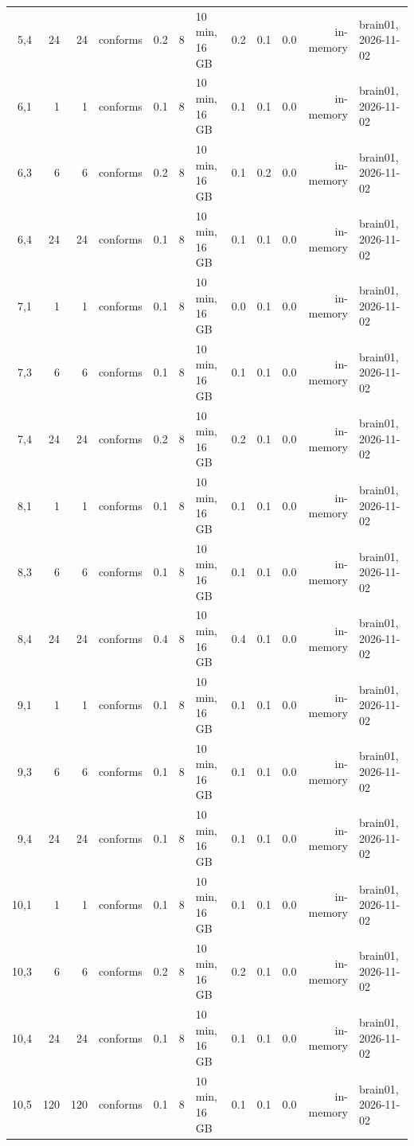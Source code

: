 \documentclass[10pt]{article}
\begin{document}
\begin{longtable}{@{}rrrlrrlrrrrl@{}}
\color{red} 5,4 & 24 & 24 & conforms & 0.2 & 8 & 10 min, 16 GB & 0.2 & 0.1 & 0.0 & in-memory & brain01, 2026-11-02 \\
\color{red} 6,1 & 1 & 1 & conforms & 0.1 & 8 & 10 min, 16 GB & 0.1 & 0.1 & 0.0 & in-memory & brain01, 2026-11-02 \\
\color{red} 6,3 & 6 & 6 & conforms & 0.2 & 8 & 10 min, 16 GB & 0.1 & 0.2 & 0.0 & in-memory & brain01, 2026-11-02 \\
\color{red} 6,4 & 24 & 24 & conforms & 0.1 & 8 & 10 min, 16 GB & 0.1 & 0.1 & 0.0 & in-memory & brain01, 2026-11-02 \\
\color{red} 7,1 & 1 & 1 & conforms & 0.1 & 8 & 10 min, 16 GB & 0.0 & 0.1 & 0.0 & in-memory & brain01, 2026-11-02 \\
\color{red} 7,3 & 6 & 6 & conforms & 0.1 & 8 & 10 min, 16 GB & 0.1 & 0.1 & 0.0 & in-memory & brain01, 2026-11-02 \\
\color{red} 7,4 & 24 & 24 & conforms & 0.2 & 8 & 10 min, 16 GB & 0.2 & 0.1 & 0.0 & in-memory & brain01, 2026-11-02 \\
\color{red} 8,1 & 1 & 1 & conforms & 0.1 & 8 & 10 min, 16 GB & 0.1 & 0.1 & 0.0 & in-memory & brain01, 2026-11-02 \\
\color{red} 8,3 & 6 & 6 & conforms & 0.1 & 8 & 10 min, 16 GB & 0.1 & 0.1 & 0.0 & in-memory & brain01, 2026-11-02 \\
\color{red} 8,4 & 24 & 24 & conforms & 0.4 & 8 & 10 min, 16 GB & 0.4 & 0.1 & 0.0 & in-memory & brain01, 2026-11-02 \\
\color{red} 9,1 & 1 & 1 & conforms & 0.1 & 8 & 10 min, 16 GB & 0.1 & 0.1 & 0.0 & in-memory & brain01, 2026-11-02 \\
\color{red} 9,3 & 6 & 6 & conforms & 0.1 & 8 & 10 min, 16 GB & 0.1 & 0.1 & 0.0 & in-memory & brain01, 2026-11-02 \\
\color{red} 9,4 & 24 & 24 & conforms & 0.1 & 8 & 10 min, 16 GB & 0.1 & 0.1 & 0.0 & in-memory & brain01, 2026-11-02 \\
\color{red} 10,1 & 1 & 1 & conforms & 0.1 & 8 & 10 min, 16 GB & 0.1 & 0.1 & 0.0 & in-memory & brain01, 2026-11-02 \\
\color{red} 10,3 & 6 & 6 & conforms & 0.2 & 8 & 10 min, 16 GB & 0.2 & 0.1 & 0.0 & in-memory & brain01, 2026-11-02 \\
\color{red} 10,4 & 24 & 24 & conforms & 0.1 & 8 & 10 min, 16 GB & 0.1 & 0.1 & 0.0 & in-memory & brain01, 2026-11-02 \\
\color{red} 10,5 & 120 & 120 & conforms & 0.1 & 8 & 10 min, 16 GB & 0.1 & 0.1 & 0.0 & in-memory & brain01, 2026-11-02 \\

\end{longtable}
\end{document}
